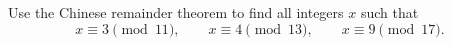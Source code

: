Use the Chinese remainder theorem to find all integers $x$ such that
\[
x\equiv3\pmod{11},\qquad x\equiv4\pmod{13},\qquad x\equiv9\pmod{17}.
\]
